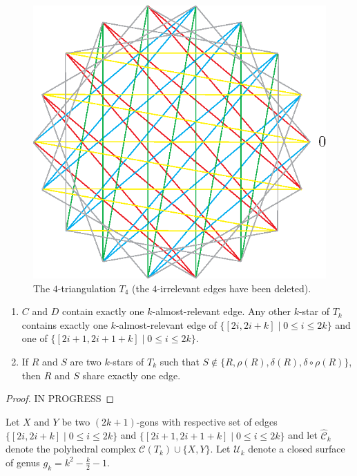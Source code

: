 \documentclass[12pt]{amsart}
\begin{document}
\begin{figure}
\centerline{\includegraphics[scale=1]{18-gon.eps}}
\caption{\small{The $4$-triangulation $T_4$ (the $4$-irrelevant edges have been deleted).}}\label{18-gon}
\end{figure}

\begin{lemma}
\begin{enumerate}
\item $C$ and $D$ contain exactly one $k$-almost-relevant edge. Any other $k$-star of $T_k$ contains exactly one $k$-almost-relevant edge of $\{[2i,2i+k]\;|\; 0\le i\le 2k\}$ and one of $\{[2i+1,2i+1+k]\;|\; 0\le i\le 2k\}$.
\item If $R$ and $S$ are two $k$-stars of $T_k$ such that $S\notin\{R,\rho(R),\delta(R),\delta\circ\rho(R)\}$, then $R$ and $S$ share exactly one edge.
\end{enumerate}
\end{lemma}

\begin{proof}
IN PROGRESS
\end{proof}

Let $X$ and $Y$ be two $(2k+1)$-gons with respective set of edges $\{[2i,2i+k]\;|\; 0\le i\le 2k\}$ and $\{[2i+1,2i+1+k]\;|\; 0\le i\le 2k\}$ and let $\hat{\mathcal{C}}_k$ denote the polyhedral complex $\mathcal{C}(T_k)\cup\{X,Y\}$.
Let $\mathcal{U}_k$ denote a closed surface of genus $g_k=k^2-\frac{k}{2}-1$.
\end{document}

